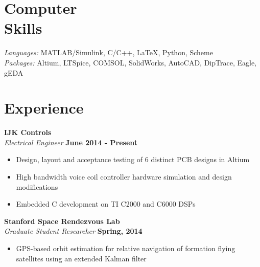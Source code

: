 \documentclass[margin,line]{resume}
\begin{document}
\begin{resume}
    \section{\mysidestyle Computer\\ Skills}

    \textsl{Languages:} MATLAB/Simulink, C/C++, \LaTeX , Python, Scheme\\
    \textsl{Packages:} Altium, LTSpice, COMSOL, SolidWorks, AutoCAD, DipTrace, Eagle, gEDA%


    \section{\mysidestyle Experience}

    \textbf{IJK Controls}\\
    \textsl{Electrical Engineer} \hfill \textbf{June 2014 - Present}\\ \vspace{-4mm}
    \begin{itemize} \itemsep -2pt
        \item Design, layout and acceptance testing of 6 distinct PCB designs in Altium
        \item High bandwidth voice coil controller hardware simulation and design modifications
        \item Embedded C development on TI C2000 and C6000 DSPs
    \end{itemize} \vspace{-2.25mm}

    \textbf{Stanford Space Rendezvous Lab}\\
    \textsl{Graduate Student Researcher} \hfill \textbf{Spring, 2014}\\ \vspace{-4mm}
    \begin{itemize} \itemsep -2pt
        \item GPS-based orbit estimation for relative navigation of formation flying satellites using an extended Kalman filter
    \end{itemize} \vspace{-2.25mm}


\end{resume}
\end{document}
